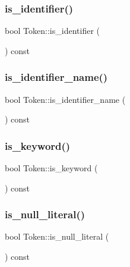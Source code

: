 \mbox{\label{class_token_a3099586a66bb18eafee512ba32f3b75d}} 
\subsubsection{\texorpdfstring{is\+\_\+identifier()}{is\_identifier()}}
{\footnotesize\ttfamily bool Token\+::is\+\_\+identifier (\begin{DoxyParamCaption}{ }\end{DoxyParamCaption}) const}

\mbox{\label{class_token_a00ae85f794f2c6a2da22b1454ecd4e84}} 
\subsubsection{\texorpdfstring{is\+\_\+identifier\+\_\+name()}{is\_identifier\_name()}}
{\footnotesize\ttfamily bool Token\+::is\+\_\+identifier\+\_\+name (\begin{DoxyParamCaption}{ }\end{DoxyParamCaption}) const}

\mbox{\label{class_token_a73de586a62c6a20442a3d5218f248056}} 
\subsubsection{\texorpdfstring{is\+\_\+keyword()}{is\_keyword()}}
{\footnotesize\ttfamily bool Token\+::is\+\_\+keyword (\begin{DoxyParamCaption}{ }\end{DoxyParamCaption}) const}

\mbox{\label{class_token_a164aae8af0eb44720bd198169349c5c6}} 
\subsubsection{\texorpdfstring{is\+\_\+null\+\_\+literal()}{is\_null\_literal()}}
{\footnotesize\ttfamily bool Token\+::is\+\_\+null\+\_\+literal (\begin{DoxyParamCaption}{ }\end{DoxyParamCaption}) const}

